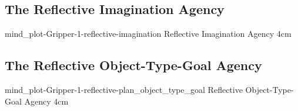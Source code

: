 {\clearpage
  \subsection{The Reflective Imagination Agency}
  \experimentcausegroupplots{\dataappendixmaxtime}
                            {\dataappendixexperimentonemaxtime}
                            {\dataappendixexperimenttwomaxtime}
                            {\dataappendixexperimentthreemaxtime}
                            {\dataappendixexperimentonename}
                            {\dataappendixexperimenttwoname}
                            {\dataappendixexperimentthreename}
                            {\dataappendixexperimentoneprettyname}
                            {\dataappendixexperimenttwoprettyname}
                            \experimentcausegroupplotscontinued{\dataappendixexperimentthreeprettyname}
                                                               {mind_plot-Gripper-1-reflective-imagination}
                                                               {Reflective Imagination Agency}
                                                               {\experimentdatacommontablereference}
                                                               {4cm}
}
{\clearpage
  \subsection{The Reflective Object-Type-Goal Agency}
  \experimentcausegroupplots{\dataappendixmaxtime}
                            {\dataappendixexperimentonemaxtime}
                            {\dataappendixexperimenttwomaxtime}
                            {\dataappendixexperimentthreemaxtime}
                            {\dataappendixexperimentonename}
                            {\dataappendixexperimenttwoname}
                            {\dataappendixexperimentthreename}
                            {\dataappendixexperimentoneprettyname}
                            {\dataappendixexperimenttwoprettyname}
                            \experimentcausegroupplotscontinued{\dataappendixexperimentthreeprettyname}
                                                               {mind_plot-Gripper-1-reflective-plan_object_type_goal}
                                                               {Reflective Object-Type-Goal Agency}
                                                               {\experimentdatacommontablereference}
                                                               {4cm}
}
